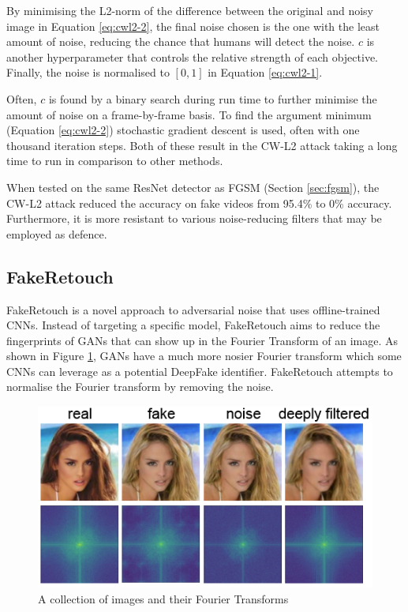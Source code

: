 By minimising the L2-norm of the difference between the original and noisy image in Equation \ref{eq:cwl2-2}, the final noise chosen is the one with the least amount of noise, reducing the chance that humans will detect the noise. $c$ is another hyperparameter that controls the relative strength of each objective. Finally, the noise is normalised to $[0,1]$ in Equation \ref{eq:cwl2-1}.

Often, $c$ is found by a binary search during run time to further minimise the amount of noise on a frame-by-frame basis. To find the argument minimum (Equation \ref{eq:cwl2-2}) stochastic gradient descent is used, often with one thousand iteration steps. Both of these result in the CW-L2 attack taking a long time to run in comparison to other methods.

When tested on the same ResNet detector as FGSM (Section \ref{sec:fgsm}), the CW-L2 attack reduced the accuracy on fake videos from 95.4\% to 0\% accuracy. Furthermore, it is more resistant to various noise-reducing filters that may be employed as defence\cite{gandhi2020adversarial}.

\subsection{FakeRetouch}

FakeRetouch\cite{huang2020fakeretouch} is a novel approach to adversarial noise that uses offline-trained CNNs. Instead of targeting a specific model, FakeRetouch aims to reduce the fingerprints of GANs that can show up in the Fourier Transform of an image. As shown in Figure \ref{fig:fakeretouch}, GANs have a much more nosier Fourier transform which some CNNs can leverage as a potential DeepFake identifier. FakeRetouch attempts to normalise the Fourier transform by removing the noise.

\begin{figure}[H]
    \centering
    \includegraphics[width=0.5\linewidth]{dissertation//figures/fakeretouch-noise.png}
    \caption{A collection of images and their Fourier Transforms}
    \label{fig:fakeretouch}
\end{figure}


